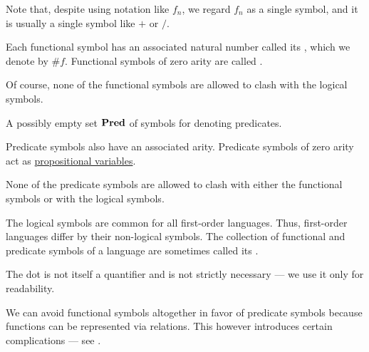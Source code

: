 \begin{definition}
\begin{description}
\begin{thmenum}[resume=def:first_order_language]
      Note that, despite using notation like \( f_n \), we regard \( f_n \) as a single symbol, and it is usually a single symbol like \( + \) or \( / \).

      Each functional symbol has an associated natural number called its , which we denote by \( \# f \). Functional symbols of zero arity are called .

      Of course, none of the functional symbols are allowed to clash with the logical symbols.

       A possibly empty  set \( \operatorname{\mathbf{Pred}} \) of symbols for denoting predicates.

      Predicate symbols also have an associated arity. Predicate symbols of zero arity act as \hyperref[def:propositional_syntax/prop]{propositional variables}.

      None of the predicate symbols are allowed to clash with either the functional symbols or with the logical symbols.
    \end{thmenum}
  \end{description}

  The logical symbols are common for all first-order languages. Thus, first-order languages differ by their non-logical symbols. The collection of functional and predicate symbols of a language are sometimes called its .
\end{definition}
\begin{comments}
  \item The dot is not itself a quantifier and is not strictly necessary --- we use it only for readability.

  \item We can avoid functional symbols altogether in favor of predicate symbols because functions can be represented via relations. This however introduces certain complications --- see .
\end{comments}

